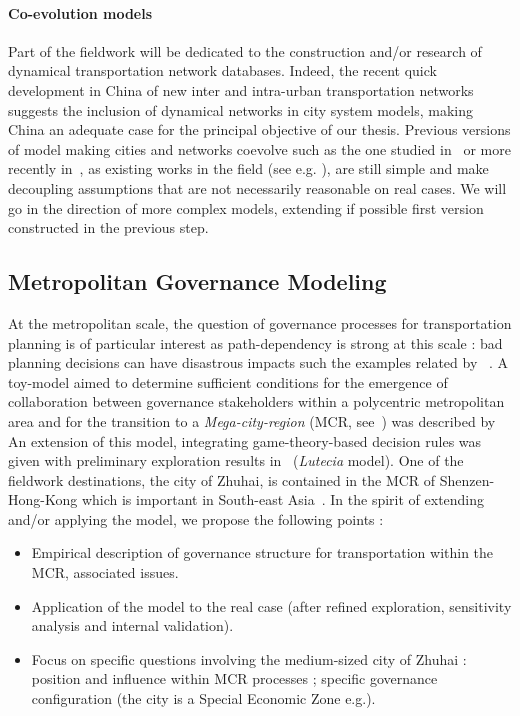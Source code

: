 \paragraph{Co-evolution models}

Part of the fieldwork will be dedicated to the construction and/or research of dynamical transportation network databases. Indeed, the recent quick development in China of new inter and intra-urban transportation networks \cite{kenworthy2002transport,lyu2016developing} suggests the inclusion of dynamical networks in city system models, making China an adequate case for the principal objective of our thesis. Previous versions of model making cities and networks coevolve such as the one studied in~\cite{raimbault2014hybrid} or more recently in~\cite{raimbault2016generation}, as existing works in the field (see e.g. \cite{schmitt2014modelisation}), are still simple and make decoupling assumptions that are not necessarily reasonable on real cases. We will go in the direction of more complex models, extending if possible first version constructed in the previous step.


\subsection{Metropolitan Governance Modeling}


At the metropolitan scale, the question of governance processes for transportation planning is of particular interest as path-dependency is strong at this scale : bad planning decisions can have disastrous impacts such the examples related by~ \cite{hall1982great}. A toy-model aimed to determine sufficient conditions for the emergence of collaboration between governance stakeholders within a polycentric metropolitan area and for the transition to a \emph{Mega-city-region} (MCR, see~\cite{florida2008rise}) was described by~\cite{lenechet2012} An extension of this model, integrating game-theory-based decision rules was given with preliminary exploration results in~\cite{lenechet:halshs-01272236} (\emph{Lutecia} model). One of the fieldwork destinations, the city of Zhuhai, is contained in the MCR of Shenzen-Hong-Kong which is important in South-east Asia~\cite{swerts2015megacities}. In the spirit of extending and/or applying the model, we propose the following points :
\begin{itemize}
\item Empirical description of governance structure for transportation within the MCR, associated issues.
\item Application of the model to the real case (after refined exploration, sensitivity analysis and internal validation).
\item Focus on specific questions involving the medium-sized city of Zhuhai : position and influence within MCR processes ; specific governance configuration (the city is a Special Economic Zone e.g.).
\end{itemize}

